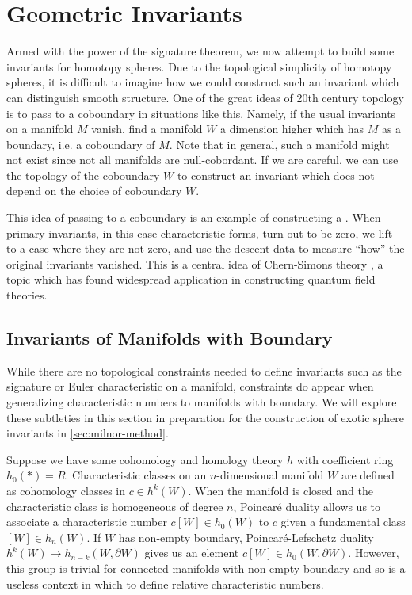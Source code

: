 \section{Geometric Invariants}\label{sec:invariants-for-homotopy-4k-1-spheres}

Armed with the power of the signature theorem, we now attempt to build some invariants for homotopy spheres.
Due to the topological simplicity of homotopy spheres, it is difficult to imagine how we could construct such an invariant which can distinguish smooth structure. One of the great ideas of 20th century topology is to pass to a coboundary in situations like this. Namely, if the usual invariants on a manifold $M$ vanish, find a manifold $W$ a dimension higher which has $M$ as a boundary, i.e. a coboundary of $M$. Note that in general, such a manifold might not exist since not all manifolds are null-cobordant. If we are careful, we can use the topology of the coboundary $W$ to construct an invariant which does not depend on the choice of coboundary $W$.

\begin{remark*}
	This idea of passing to a coboundary is an example of constructing a . When primary invariants, in this case characteristic forms, turn out to be zero, we lift to a case where they are not zero, and use the descent data to measure ``how'' the original invariants vanished. This is a central idea of Chern-Simons theory \cite{chernsimons1974geometric}, a topic which has found widespread application in constructing quantum field theories.
\end{remark*}

\subsection{Invariants of Manifolds with Boundary}\label{sec:relative-invariants}

While there are no topological constraints needed to define invariants such as the signature or Euler characteristic on a manifold, constraints do appear when generalizing characteristic numbers to manifolds with boundary. We will explore these subtleties in this section in preparation for the construction of exotic sphere invariants in \cref{sec:milnor-method}.

Suppose we have some cohomology and homology theory $h$ with coefficient ring $h_0(*)=R$.
Characteristic classes on an $n$-dimensional manifold $W$ are defined as cohomology classes in $c\in h^k(W)$. When the manifold is closed and the characteristic class is homogeneous of degree $n$, Poincar\'e duality allows us to associate a characteristic number $c[W]\in h_0(W)$ to $c$ given a fundamental class $[W]\in h_n(W)$. If $W$ has non-empty boundary, Poincar\'e-Lefschetz duality $h^k(W)\to h_{n-k}(W,\partial W)$ gives us an element $c[W]\in h_0(W,\partial W)$. However, this group is trivial for connected manifolds with non-empty boundary and so is a useless context in which to define relative characteristic numbers.

